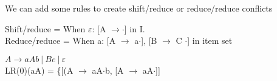 \noindent We can add some rules to create shift/reduce or reduce/reduce conflicts

\noindent Shift/reduce = When $\varepsilon$: {[A $\to \cdot$]} in I. \\
Reduce/reduce = When a: {[A $\to$ a$\cdot$]}, {[B $\to$ C $\cdot$]} in item set

\begin{center}
    $ A \to aAb \ | \ Be  \ | \ \varepsilon $ \\
    LR(0)(aA) = \{{[(A $\to$ aA$\cdot$b, {[A $\to$ aA$\cdot$]}]}
\end{center}